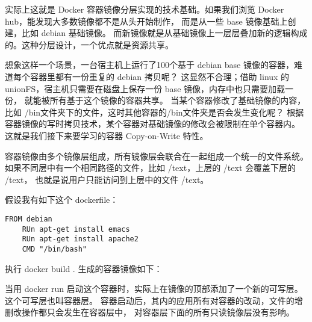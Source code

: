实际上这就是 Docker 容器镜像分层实现的技术基础。如果我们浏览 Docker hub，能发现大多数镜像都不是从头开始制作，
而是从一些 base 镜像基础上创建，比如 debian 基础镜像。
而新镜像就是从基础镜像上一层层叠加新的逻辑构成的。这种分层设计，一个优点就是资源共享。

想象这样一个场景，一台宿主机上运行了100个基于 debian base 镜像的容器，难道每个容器里都有一份重复的 debian 拷贝呢？
这显然不合理；借助 linux 的 unionFS，宿主机只需要在磁盘上保存一份 base 镜像，内存中也只需要加载一份，
就能被所有基于这个镜像的容器共享。
当某个容器修改了基础镜像的内容，比如 /bin文件夹下的文件，这时其他容器的/bin文件夹是否会发生变化呢？
根据容器镜像的写时拷贝技术，某个容器对基础镜像的修改会被限制在单个容器内。
这就是我们接下来要学习的容器 Copy-on-Write 特性。

容器镜像由多个镜像层组成，所有镜像层会联合在一起组成一个统一的文件系统。
如果不同层中有一个相同路径的文件，比如 /text，上层的 /text 会覆盖下层的 /text，
也就是说用户只能访问到上层中的文件 /text。

假设我有如下这个 dockerfile：

\begin{lstlisting}[frame=shadowbox]
    FROM debian
    RUn apt-get install emacs
    RUn apt-get install apache2
    CMD "/bin/bash"
\end{lstlisting}

执行 docker build .
生成的容器镜像如下：

当用 docker run 启动这个容器时，实际上在镜像的顶部添加了一个新的可写层。这个可写层也叫容器层。
容器启动后，其内的应用所有对容器的改动，文件的增删改操作都只会发生在容器层中，
对容器层下面的所有只读镜像层没有影响。

\newpage

